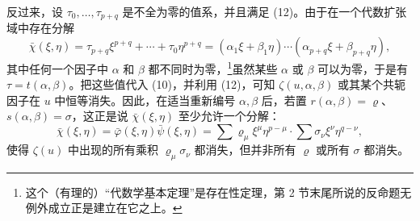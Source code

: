反过来，设 $\tau_0,\ldots,\tau_{p+q}$ 是不全为零的值系，并且满足 (12)。由于在一个代数扩张域中存在分解
\begin{equation}
 \bar\chi(\xi,\eta)=\tau_{p+q}\xi^{p+q}+\cdots+\tau_0\eta^{p+q}
=(\alpha_1\xi+\beta_1\eta)\cdots(\alpha_{p+q}\xi+\beta_{p+q}\eta),
\tag{12'}
\end{equation}
其中任何一个因子中 $\alpha$ 和 $\beta$ 都不同时为零，\footnote{这个（有理的）“代数学基本定理”是存在性定理，第 2 节末尾所说的反命题无例外成立正是建立在它之上。}虽然某些 $\alpha$ 或 $\beta$ 可以为零，于是有 $\tau=t(\alpha,\beta)$。把这些值代入 (10)，并利用 (12)，可知 $\zeta(u,\alpha,\beta)$ 或其某个共轭因子在 $u$ 中恒等消失。因此，在适当重新编号 $\alpha,\beta$ 后，若置 $r(\alpha,\beta)=\varrho$、$s(\alpha,\beta)=\sigma$，这正是说 $\bar\chi(\xi,\eta)$ 至少允许一个分解：
\begin{equation}
\bar\chi(\xi,\eta)=\bar\varphi(\xi,\eta)\bar\psi(\xi,\eta)
=\sum \varrho_\mu\xi^\mu\eta^{p-\mu}\cdot\sum \sigma_\nu\xi^\nu\eta^{q-\nu},
\tag{13}
\end{equation}
使得 $\zeta(u)$ 中出现的所有乘积 $\varrho_\mu\sigma_\nu$ 都消失，但并非所有 $\varrho$ 或所有 $\sigma$ 都消失。

